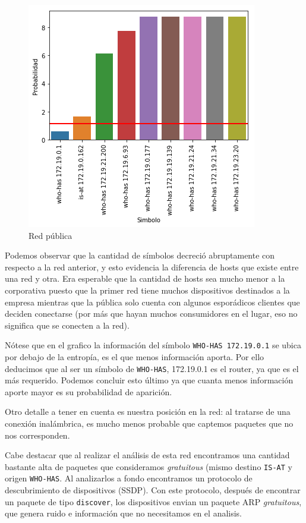 \begin{figure}[H]
	\centering
	\includegraphics[width=.5\linewidth]{imagenes/mac_hosts}
	\caption{Red pública}
\end{figure}

Podemos observar que la cantidad de símbolos decreció abruptamente con respecto a la red anterior, y esto evidencia la diferencia de hosts que existe entre una red y otra. Era esperable que la cantidad de hosts sea mucho menor a la corporativa puesto que la primer red tiene muchos dispositivos destinados a la empresa mientras que la pública solo cuenta con algunos esporádicos clientes que deciden conectarse (por más que hayan muchos consumidores en el lugar, eso no significa que se conecten a la red).

Nótese que en el grafico la información del símbolo \texttt{WHO-HAS 172.19.0.1} se ubica por debajo de la entropía, es el que menos información aporta. Por ello deducimos que al ser un símbolo de \texttt{WHO-HAS}, 172.19.0.1 es el router, ya que es el más requerido. Podemos concluir esto último ya que cuanta menos información aporte mayor es su probabilidad de aparición.

Otro detalle a tener en cuenta es nuestra posición en la red: al tratarse de una conexión inalámbrica, es mucho menos probable que captemos paquetes que no nos corresponden.

Cabe destacar que al realizar el análisis de esta red encontramos una cantidad bastante alta de paquetes que consideramos \textit{gratuitous} (mismo destino \texttt{IS-AT} y origen \texttt{WHO-HAS}. Al analizarlos a fondo encontramos un protocolo de descubrimiento de dispositivos (SSDP). Con este protocolo, después de encontrar un paquete de tipo \texttt{discover}, los dispositivos envian un paquete ARP \textit{gratuitous}, que genera ruido e información que no necesitamos en el analisis.


